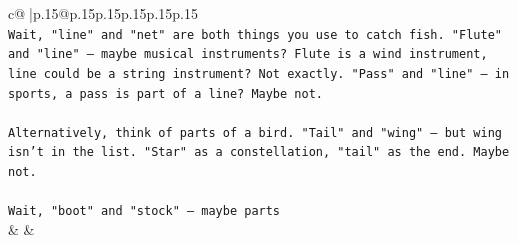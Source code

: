 \documentclass{article}
\begin{document}
{\begin{supertabular}{c@{$\;$}|p{.15\linewidth}@{}p{.15\linewidth}p{.15\linewidth}p{.15\linewidth}p{.15\linewidth}p{.15\linewidth}}
{{{\\ 
\texttt{Wait, "line" and "net" are both things you use to catch fish. "Flute" and "line" – maybe musical instruments? Flute is a wind instrument, line could be a string instrument? Not exactly. "Pass" and "line" – in sports, a pass is part of a line? Maybe not.} \\
\\ 
\texttt{Alternatively, think of parts of a bird. "Tail" and "wing" – but wing isn't in the list. "Star" as a constellation, "tail" as the end. Maybe not.} \\
\\ 
\texttt{Wait, "boot" and "stock" – maybe parts} \\
            }
        }
    }
    & & \\ \\


\end{supertabular}}
\end{document}
